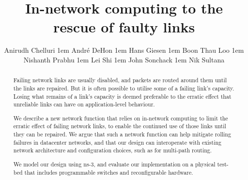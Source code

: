 \documentclass[sigconf]{acmart}
\begin{document}
\title{In-network computing to the rescue of faulty links}

\author{Anirudh Chelluri \kern1em
 Andr\'e DeHon \kern1em
 Hans Giesen \kern1em
 Boon Thau Loo \kern1em
 Nishanth Prabhu \kern1em
 Lei Shi \kern1em
 John Sonchack \kern1em
 Nik Sultana}

%
%
%
%


\renewcommand{\shortauthors}{A. Chelluri et al.}

\begin{abstract}
Failing network links are usually disabled, and packets are routed around them
until the links are repaired.  But it is often possible
to utilise some of a failing link's capacity. Losing what remains of a link's
capacity is deemed preferable to the erratic effect that unreliable links can
have on application-level behaviour.

We describe a new network function that relies on in-network computing to limit
the erratic effect of failing network links, to enable the continued use of
those links until they can be repaired. We argue that such a network function
can help mitigate rolling failures in datacenter networks, and that our design
can interoperate with existing network architecture and configuration choices,
such as for multi-path routing.

We model our design using ns-3, and evaluate our implementation on a physical
test-bed that includes programmable switches and reconfigurable hardware.
\end{abstract}
\end{document}
